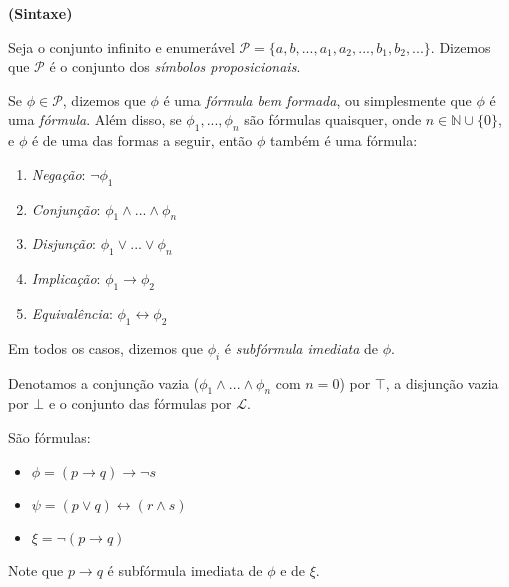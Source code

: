 
\begin{definition}\textbf{(Sintaxe)}
	
	Seja o conjunto infinito e enumerável $\mathcal{P} = \{a,b,...,a_1,a_2,...,b_1,b_2,...\}$. Dizemos que $\mathcal{P}$ é o conjunto dos \emph{símbolos proposicionais}.
	
    Se $\phi \in \mathcal{P}$, dizemos que $\phi$ é uma \emph{fórmula bem formada}, ou simplesmente que $\phi$ é uma \emph{fórmula}. Além disso, se $\phi_1,...,\phi_n$ são fórmulas quaisquer, onde $n \in \mathbb{N} \cup \{0\}$, e $\phi$ é de uma das formas a seguir, então $\phi$ também é uma fórmula:
    \begin{enumerate}
        \item \emph{Negação}: $\neg \phi_1$
        \item \emph{Conjunção}: $\phi_1 \wedge ... \wedge \phi_n$
        \item \emph{Disjunção}: $\phi_1 \vee ... \vee \phi_n$
        \item \emph{Implicação}: $\phi_1 \rightarrow \phi_2$
        \item \emph{Equivalência}: $\phi_1 \leftrightarrow \phi_2$
    \end{enumerate}
    Em todos os casos, dizemos que $\phi_i$ é \emph{subfórmula imediata} de $\phi$.
    
    Denotamos a conjunção vazia ($\phi_1 \wedge ... \wedge \phi_n$ com $n=0$) por $\top$, a disjunção vazia por $\bot$ e o conjunto das fórmulas por $\mathcal{L}$.
\end{definition}

\begin{example}
	São fórmulas:
	\begin{itemize}
		\item $\phi = (p \rightarrow q) \rightarrow \neg s$
		\item $\psi = (p \vee q) \leftrightarrow (r \wedge s)$
		\item $\xi  = \neg(p \rightarrow q)$
	\end{itemize}
	Note que $p \rightarrow q$ é subfórmula imediata de $\phi$ e de $\xi$.
\end{example}

